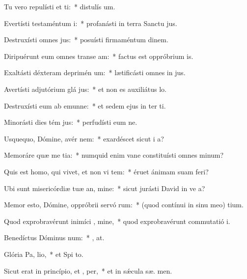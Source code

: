 \item Tu vero repulísti et ti:~* distulís  um.
\item Evertísti testaméntum  i:~* profanásti in terra Sanctu jus.
\item Destruxísti omnes  jus:~* posuísti firmaméntum  dinem.
\item Diripuérunt eum omnes transe am:~* factus est oppróbrium  is.
\item Exaltásti déxteram deprimén um:~* lætificásti omnes in jus.
\item Avertísti adjutórium glá jus:~* et non es auxiliátus   lo.
\item Destruxísti eum ab emunne:~* et sedem ejus in ter ti.
\item Minorásti dies tém jus:~* perfudísti eum ne.
\item Usquequo, Dómine, avér  nem:~* exardéscet sicut i  a?
\item Memoráre quæ me tia:~* numquid enim vane constituísti omnes  minum?
\item Quis est homo, qui vivet, et non vi tem:~* éruet ánimam suam   feri?
\item Ubi sunt misericórdiæ tuæ an, mine:~* sicut jurásti David in ve a?
\item Memor esto, Dómine, oppróbrii servó rum:~* (quod contínui in sinu meo)  tium.
\item Quod exprobravérunt inimíci , mine,~* quod exprobravérunt commutatió  i.
\item Benedíctus Dóminus  num:~* , at.
\item Glória Pa,  lio,~* et Spi to.
\item Sicut erat in princípio, et ,  per,~* et in sǽcula sæ. men.
